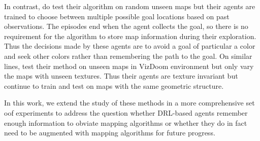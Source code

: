 In contrast, \cite{OhChSiICML2016} do test their algorithm on random unseen maps but their agents are trained to choose between multiple possible goal locations based on past observations.
The episodes end when the agent collects the goal, so there is no requirement for the algorithm to store map information during their exploration.
Thus the decisions made by these agents are to avoid a goal of particular a color and seek other colors rather than remembering the path to the goal.
On similar lines, \cite{ChLaSaNIPS2016} test their method on unseen maps in VizDoom environment but only vary the maps with unseen textures. Thus their agents are texture invariant but continue to train and test on maps with the same geometric structure.
%

In this work, we extend the study of these methods in a more comprehensive set oof experiments to address the question whether DRL-based agents remember enough information to obviate mapping algorithms or whether they do in fact need to be augmented with mapping algorithms for future progress.
